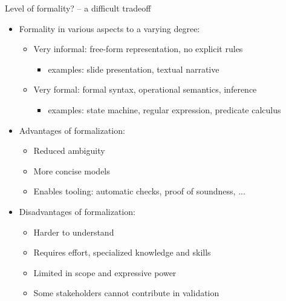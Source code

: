 \begin{Slide}{Level of formality? -- a difficult tradeoff}
\begin{itemize}
\item Formality in various aspects to a varying degree:
\begin{itemize}
\item Very informal: free-form representation, no explicit rules 
\begin{itemize}
\item examples: slide presentation, textual narrative
\end{itemize}
\item Very formal: formal syntax, operational semantics, inference
\begin{itemize}
\item examples: state machine, regular expression, predicate calculus
\end{itemize}
\end{itemize}
\item Advantages of formalization:
\begin{itemize}
\item Reduced ambiguity
\item More concise models
\item Enables tooling: automatic checks, proof of soundness, ...
\end{itemize}
\item Disadvantages of formalization:
\begin{itemize}
\item Harder to understand
\item Requires effort, specialized knowledge and skills
\item Limited in scope and expressive power
\item Some stakeholders cannot contribute in validation


\end{itemize}
\end{itemize}
\end{Slide}